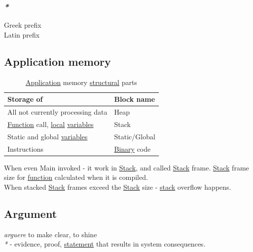 \documentclass[11pt]{article}
\begin{document}
\subsubsection{\emph{*}}
\label{sec:org7e92358}

\label{orgbf5096c}Greek prefix\\
\label{org45819ba}Latin prefix\\

\subsection{\label{org441994d}Application memory}
\label{sec:org466bf79}
\begin{table}[htbp]
\caption{\label{tab:application-memory-structural-parts}\hyperref[orged2f814]{Application} memory \hyperref[org0ad5a4b]{structural} parts}
\centering
\begin{tabular}{ll}
Storage of & Block name\\
\hline
All not currently processing data & \label{orga8c8008}Heap\\
\hyperref[orgeb5cddb]{Function} call, \hyperref[org37376b3]{local} \hyperref[orgd3f3ade]{variables} & \label{org901a5a9}Stack\\
Static and global \hyperref[orgd3f3ade]{variables} & Static/Global\\
Instructions & \hyperref[orgee106ab]{Binary} code\\
\end{tabular}
\end{table}

When even Main invoked - it work in \hyperref[org901a5a9]{Stack}, and called \hyperref[org901a5a9]{Stack} frame. \hyperref[org901a5a9]{Stack} frame size for \hyperref[orgeb5cddb]{function} calculated when it is compiled.\\
When stacked \hyperref[org901a5a9]{Stack} frames exceed the \hyperref[org901a5a9]{Stack} size - \hyperref[org901a5a9]{stack} overflow happens.\\

\subsection{\label{orgf66a5f7}Argument}
\label{sec:org0e7263b}
\emph{arguere} to make clear, to shine\\

\emph{*} - evidence, proof, \hyperref[org0fdd00d]{statement} that results in system consequences.\\
\end{document}
